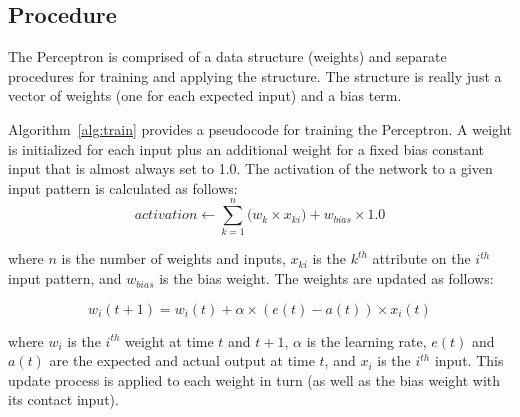 \subsection{Procedure}
The Perceptron is comprised of a data structure (weights) and separate procedures for training and applying the structure. The structure is really just a vector of weights (one for each expected input) and a bias term.

Algorithm~\ref{alg:train} provides a pseudocode for training the Perceptron. A weight is initialized for each input plus an additional weight for a fixed bias constant input that is almost always set to 1.0. The activation of the network to a given input pattern is calculated as follows:
\begin{equation}
	activation \leftarrow \sum_{k=1}^{n}\big( w_{k} \times x_{ki}\big) + w_{bias} \times 1.0
\end{equation}

where $n$ is the number of weights and inputs, $x_{ki}$ is the $k^{th}$ attribute on the $i^{th}$ input pattern, and $w_{bias}$ is the bias weight. The weights are updated as follows:

\begin{equation}
	w_{i}(t+1) = w_{i}(t) + \alpha \times (e(t)-a(t)) \times x_{i}(t)
\end{equation}

where $w_i$ is the $i^{th}$ weight at time $t$ and $t+1$, $\alpha$ is the learning rate, $e(t)$ and $a(t)$ are the expected and actual output at time $t$, and $x_i$ is the $i^{th}$ input. This update process is applied to each weight in turn (as well as the bias weight with its contact input).

